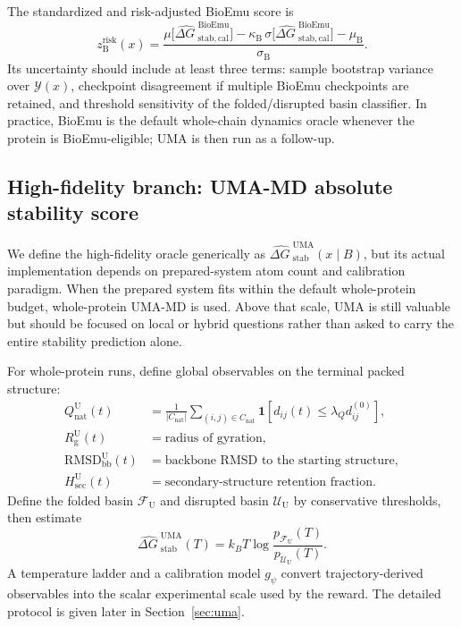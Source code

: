 \documentclass[11pt]{article}
\newcommand{\dG}{\ensuremath{\Delta G \ }}
\begin{document}
	The standardized and risk-adjusted BioEmu score is
	\begin{equation}
		z_{\mathrm B}^{\mathrm{risk}}(x)=\frac{\mu\big[\widehat{\dG}^{\mathrm{BioEmu}}_{\mathrm{stab,cal}}\big]-\kappa_{\mathrm B}\,\sigma\big[\widehat{\dG}^{\mathrm{BioEmu}}_{\mathrm{stab,cal}}\big]-\mu_{\mathrm B}}{\sigma_{\mathrm B}}.
	\end{equation}
	Its uncertainty should include at least three terms: sample bootstrap variance over $\mathcal{Y}(x)$, checkpoint disagreement if multiple BioEmu checkpoints are retained, and threshold sensitivity of the folded/disrupted basin classifier. In practice, BioEmu is the default whole-chain dynamics oracle whenever the protein is BioEmu-eligible; UMA is then run as a follow-up.
	
	
	\subsection{High-fidelity branch: UMA-MD absolute stability score}
	
	We define the high-fidelity oracle generically as $\widehat{\dG}^{\mathrm{UMA}}_{\mathrm{stab}}(x\mid B)$, but its actual implementation depends on prepared-system atom count and calibration paradigm. When the prepared system fits within the default whole-protein budget, whole-protein UMA-MD is used. Above that scale, UMA is still valuable but should be focused on local or hybrid questions rather than asked to carry the entire stability prediction alone.
	
	For whole-protein runs, define global observables on the terminal packed structure:
	\begin{align}
		Q_{\mathrm{nat}}^{\mathrm U}(t) &= \frac{1}{|C_{\mathrm{nat}}|}\sum_{(i,j)\in C_{\mathrm{nat}}}\mathbf{1}\!\left[d_{ij}(t)\leq \lambda_Q d_{ij}^{(0)}\right],\\
		R_{\mathrm g}^{\mathrm U}(t) &= \text{radius of gyration},\\
		\mathrm{RMSD}_{\mathrm{bb}}^{\mathrm U}(t) &= \text{backbone RMSD to the starting structure},\\
		H_{\mathrm{sec}}^{\mathrm U}(t) &= \text{secondary-structure retention fraction}.
	\end{align}
	Define the folded basin $\mathcal{F}_{\mathrm U}$ and disrupted basin $\mathcal{U}_{\mathrm U}$ by conservative thresholds, then estimate
	\begin{equation}
		\label{eq:twostategreward}
		\widehat{\dG}^{\mathrm{UMA}}_{\mathrm{stab}}(T)=k_B T \log\frac{p_{\mathcal{F}_{\mathrm U}}(T)}{p_{\mathcal{U}_{\mathrm U}}(T)}.
	\end{equation}
	A temperature ladder and a calibration model $g_\psi$ convert trajectory-derived observables into the scalar experimental scale used by the reward. The detailed protocol is given later in Section~\ref{sec:uma}.
	
\end{document}
